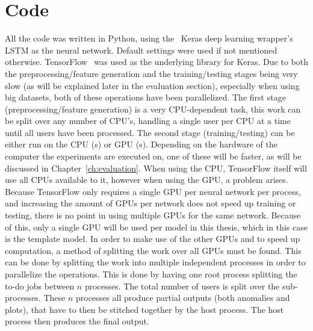\section{Code}
All the code was written in Python, using the~\cite{chollet2015keras} Keras deep learning wrapper's LSTM as the neural network. Default settings were used if not mentioned otherwise. TensorFlow~\cite{tensorflow2015-whitepaper} was used as the underlying library for Keras. Due to both the preprocessing/feature generation and the training/testing stages being very slow (as will be explained later in the evaluation section), especially when using big datasets, both of these operations have been parallelized. The first stage (preprocessing/feature generation) is a very CPU-dependent task, this work can be split over any number of CPU's, handling a single user per CPU at a time until all users have been processed. The second stage (training/testing) can be either run on the CPU (s) or GPU (s). Depending on the hardware of the computer the experiments are executed on, one of these will be faster, as will be discussed in Chapter~\ref{ch:evaluation}. When using the CPU, TensorFlow itself will use all CPUs available to it, however when using the GPU, a problem arises. Because TensorFlow only requires a single GPU per neural network per process, and increasing the amount of GPUs per network does not speed up training or testing, there is no point in using multiple GPUs for the same network. Because of this, only a single GPU will be used per model in this thesis, which in this case is the template model. In order to make use of the other GPUs and to speed up computation, a method of splitting the work over all GPUs must be found. This can be done by splitting the work into multiple independent processes in order to parallelize the operations. This is done by having one root process splitting the to-do jobs between \(n\) processes. The total number of users is split over the sub-processes. These \(n\) processes all produce partial outputs (both anomalies and plots), that have to then be stitched together by the host process. The host process then produces the final output.